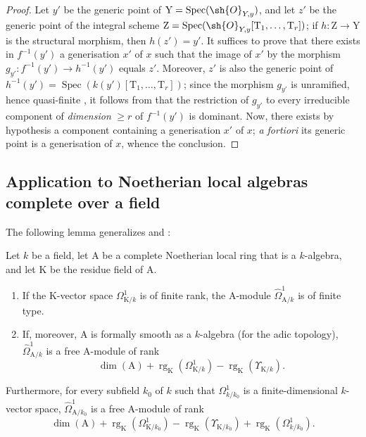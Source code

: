 \begin{proof}
Let $y'$ be the generic point of $\mathrm{Y}=\operatorname{Spec}(\sh{O}_{Y,y})$, and let $z'$ be the generic point of the integral scheme $\mathrm{Z}=\operatorname{Spec}(\sh{O}_{Y,y}[\mathrm{T}_1,\ldots,\mathrm{T}_r])$; if $h:\mathrm{Z}\to\mathrm{Y}$ is the structural morphism, then $h(z')=y'$.
It suffices to prove that there exists in $f^{-1}(y')$ a generisation $x'$ of $x$ such that the image of $x'$ by the morphism $g_{y'}:f^{-1}(y')\to h^{-1}(y')$ equals $z'$.
Moreover, $z'$ is also the generic point of $h^{-1}(y')=\operatorname{Spec}(k(y')[\mathrm{T}_1,\ldots,\mathrm{T}_r])$; since the morphism $g_{y'}$ is unramified, hence quasi-finite , it follows from  that the restriction of $g_{y'}$ to every irreducible component of \emph{dimension} $\geq r$ of $f^{-1}(y')$ is dominant.
Now, there exists by hypothesis a component containing a generisation $x'$ of $x$; \emph{a fortiori} its generic point is a generisation of $x$, whence the conclusion.
\end{proof}

\subsection{Application to Noetherian local algebras complete over a field}
\label{subsection:IV.18.11}

The following lemma generalizes  and :

\begin{lemma}[18.11.1]
\label{IV.18.11.1}
Let $k$ be a field, let $\mathrm{A}$ be a complete Noetherian local ring that is a $k$-algebra, and let $\mathrm{K}$ be the residue field of $\mathrm{A}$.
\begin{enumerate}[label=(\roman*)]
  \item If the $\mathrm{K}$-vector space $\Omega^1_{\mathrm{K}/k}$ is of finite rank, the $\mathrm{A}$-module $\hat{\Omega}^1_{\mathrm{A}/k}$ is of finite type.
  \item If, moreover, $\mathrm{A}$ is formally smooth as a $k$-algebra (for the adic topology), $\hat{\Omega}^1_{\mathrm{A}/k}$ is a free $\mathrm{A}$-module of rank
\[
  \dim(\mathrm{A})+\operatorname{rg}_{\mathrm{K}}(\Omega^1_{\mathrm{K}/k})-\operatorname{rg}_{\mathrm{K}}(\Upsilon_{\mathrm{K}/k}).
\]
\end{enumerate}
Furthermore, for every subfield $k_0$ of $k$ such that $\Omega^1_{k/k_0}$ is a finite-dimensional $k$-vector space, $\hat{\Omega}^1_{\mathrm{A}/k_0}$ is a free $\mathrm{A}$-module of rank
\[
  \dim(\mathrm{A})+\operatorname{rg}_{\mathrm{K}}(\Omega^1_{\mathrm{K}/k_0})-\operatorname{rg}_{\mathrm{K}}(\Upsilon_{\mathrm{K}/k_0})+\operatorname{rg}_{\mathrm{K}}(\Omega^1_{k/k_0}).
\]
\end{lemma}

